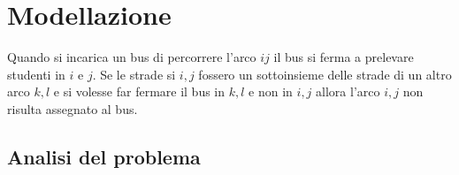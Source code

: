 
\chapter{Modellazione}

\ifpdf
    \graphicspath{{Chapter3/Figs/Raster/}{Chapter3/Figs/PDF/}{Chapter3/Figs/}}
\else
    \graphicspath{{Chapter3/Figs/Vector/}{Chapter3/Figs/}}
\fi
Quando si incarica un bus di percorrere l'arco $ij$ il bus si ferma a prelevare studenti in $i$ e $j$. Se le strade si $i,j$ fossero un sottoinsieme delle strade di un altro arco $k,l$ e si volesse far fermare il bus in $k,l$ e non in $i,j$ allora l'arco $i,j$ non risulta assegnato al bus.
\section{Analisi del problema}


